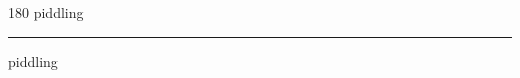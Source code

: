 
\begin{frame}
\begin{center}
\begin{turn}{180}
{\fontsize{2.5cm}{1em}\selectfont piddling}
\end{turn}
\vspace{1em}\par  
\hrule
\vspace{1em}\par  
{\fontsize{2.5cm}{1em}\selectfont piddling}
\end{center}
\end{frame}
